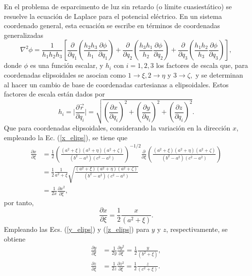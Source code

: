 En el problema de esparcimento de luz sin retardo (o límite cuasiestático) se resuelve la ecuación de Laplace para el potencial eléctrico. En un sistema coordenado general, esta ecuación se escribe en términos de coordenadas generalizadas \cite{Arfken}
\begin{equation}
	\nabla^2\phi=\frac{1}{h_1h_2h_3}\left[\frac{\partial}{\partial q_1}\left(\frac{h_2h_3}{h_1}\frac{\partial\phi}{\partial q_1}\right)+\frac{\partial}{\partial q_2}\left(\frac{h_3h_1}{h_2}\frac{\partial\phi}{\partial q_2}\right)+\frac{\partial}{\partial q_3}\left(\frac{h_1h_2}{h_3}\frac{\partial\phi}{\partial q_3}\right)\right],
	\label{laplaciano}    
\end{equation}
donde $\phi$ es una función escalar, y  $h_i$ con $i=1,2,3$ los factores de escala que, para coordenadas elipsoidales se asocian como $1\rightarrow\xi, 2\rightarrow\eta$ y $3\rightarrow\zeta,$ y se determinan al hacer un cambio de base de coordenadas cartesianas a elipsoidales. Estos factores de escala están dados por \cite{Arfken}
\begin{equation}
	h_i=\Big|\frac{\partial \Vec{r}}{\partial q_i}\Big|=\sqrt{\left(\frac{\partial x}{\partial q_i}\right)^2+\left(\frac{\partial y}{\partial q_i}\right)^2+\left(\frac{\partial z}{\partial q_i}\right)^2}.
\end{equation} 
Que para coordenadas elipsoidales, considerando la variación en la dirección $x$, empleando la Ec. (\ref{x_elips}), se tiene que \begin{align*}
	\frac{\partial x}{\partial \xi}&=\frac{1}{2}\left(\frac{(a^2+\xi)(a^2+\eta)(a^2+\zeta)}{(b^2-a^2)(c^2-a^2)}\right)^{-1/2}\frac{\partial}{\partial \xi}\left(\frac{(a^2+\xi)(a^2+\eta)(a^2+\zeta)}{(b^2-a^2)(c^2-a^2)}\right)\nonumber\\
	&=\frac{1}{2}\frac{1}{a^2+\xi}\sqrt{\frac{(a^2+\xi)(a^2+\eta)(a^2+\zeta)}{(b^2-a^2)(c^2-a^2)}}\nonumber\\
	&=\frac{1}{2x}\frac{\partial x^2}{\partial\xi},
\end{align*}
por tanto,
\begin{equation*}
	\frac{\partial x}{\partial \xi}=\frac{1}{2}\frac{x}{(a^2+\xi)}.
\end{equation*}
Empleando las Ecs. (\ref{y_elips}) y (\ref{z_elips}) para $y$ y $z$, respectivamente, se obtiene
\begin{align*}
	\frac{\partial y}{\partial \xi}&=\frac{1}{2y}\frac{\partial y^2}{\partial\xi}=\frac{1}{2}\frac{y}{(b^2+\xi)},\\
	\frac{\partial z}{\partial \xi}&=\frac{1}{2z}\frac{\partial z^2}{\partial\xi}=\frac{1}{2}\frac{z}{(c^2+\xi)}.
\end{align*}
